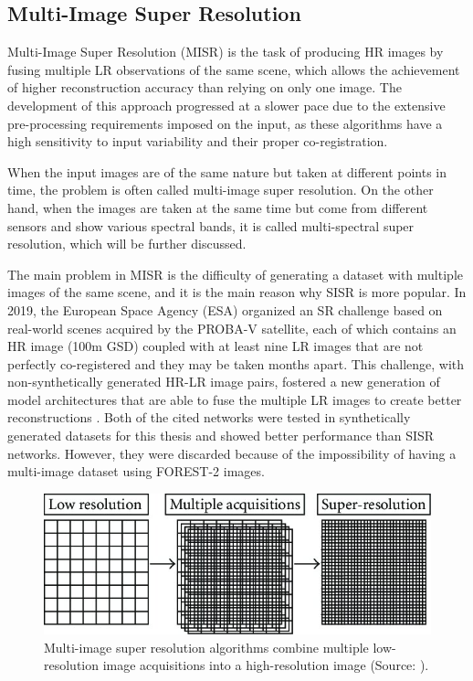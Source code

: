     \subsection{Multi-Image Super Resolution}

        Multi-Image Super Resolution (MISR) is the task of producing HR images by fusing multiple LR observations of the same scene, which allows the achievement of higher reconstruction accuracy than relying on only one image.
        The development of this approach progressed at a slower pace due to the extensive pre-processing requirements imposed on the input, as these algorithms have a high sensitivity to input variability and their proper co-registration.  

        When the input images are of the same nature but taken at different points in time, the problem is often called multi-image super resolution.
        On the other hand, when the images are taken at the same time but come from different sensors and show various spectral bands, it is called multi-spectral super resolution, which will be further discussed. 

        The main problem in MISR is the difficulty of generating a dataset with multiple images of the same scene, and it is the main reason why SISR is more popular.
        In 2019, the European Space Agency (ESA) organized an SR challenge  \cite{martens2019superresolution} based on real-world scenes acquired by the PROBA-V satellite, each of which contains an HR image (100m GSD) coupled with at least nine LR images that are not perfectly co-registered and they may be taken months apart. 
        This challenge, with non-synthetically generated HR-LR image pairs, fostered a new generation of model architectures that are able to fuse the multiple LR images to create better reconstructions \cite{Salvetti_2020,Bordone_Molini_2020}.
         Both of the cited networks were tested in synthetically generated datasets for this thesis and showed better performance than SISR networks. However, they were discarded because of the impossibility of having a multi-image dataset using FOREST-2 images.

        \begin{figure}[H]
            \centering
            \includegraphics[width=\textwidth]{Includes/2-MISR.jpeg}
            \caption{Multi-image super resolution algorithms combine multiple low-resolution image acquisitions into a high-resolution image (Source: \cite{MISR2007}).}
            \label{fig:2-MISR}
        \end{figure}
        
